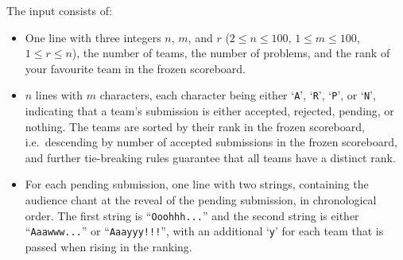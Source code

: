
    The input consists of:
    \vspace{-0.5em}%
    \begin{itemize}
        \item One line with three integers $n$, $m$, and $r$
            ($2\leq n\leq100$, $1\leq m\leq100$, $1\leq r\leq n$),
            the number of teams, the number of problems,
            and the rank of your favourite team in the frozen scoreboard.

        \item $n$ lines with $m$ characters,
            each character being either `\texttt{A}', `\texttt{R}', `\texttt{P}', or `\texttt{N}',
            indicating that a team's submission is either accepted, rejected, pending, or nothing.
            The teams are sorted by their rank in the frozen scoreboard,
            i.e.\ descending by number of accepted submissions in the frozen scoreboard,
            and further tie-breaking rules guarantee that all teams have a distinct rank.

        \item For each pending submission, one line with two strings,
            containing the audience chant at the reveal of the pending submission, in chronological order.
            The first string is ``\texttt{Ooohhh...}'' and the second string is either ``\texttt{Aaawww...}''
            or ``\texttt{Aaayyy!!!}'', with an additional `\texttt{y}' for each team that is passed when rising in the ranking.
    \end{itemize}

